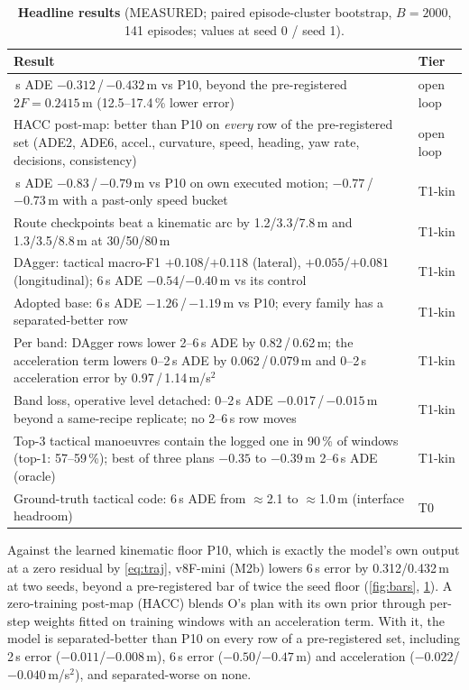 \documentclass[10pt,twocolumn]{article}
\makeatletter
\theoremstyle{remark}
\renewcommand\paragraph{\@startsection{paragraph}{4}{\z@}{1.6ex \@plus .5ex \@minus .2ex}{-1em}{\normalfont\normalsize\bfseries}}
\makeatother
\begin{document}
\begin{table}[t]
\centering
\caption{\textbf{Headline results} (MEASURED; paired episode-cluster bootstrap, $B=2000$, 141 episodes; values at seed 0 / seed 1).}
\label{tab:headline}
\small
\begin{tabularx}{\columnwidth}{@{}>{\raggedright\arraybackslash}Xl@{}}
\toprule
Result & Tier \\
\midrule
6\,s ADE $-0.312$\,/\,$-0.432$\,m vs P10, beyond the pre-registered $2F=0.2415$\,m (12.5--17.4\,\% lower error) & open loop \\
HACC post-map: better than P10 on \emph{every} row of the pre-registered set (ADE2, ADE6, accel., curvature, speed, heading, yaw rate, decisions, consistency) & open loop \\
6\,s ADE $-0.83$\,/\,$-0.79$\,m vs P10 on own executed motion; $-0.77$\,/\,$-0.73$\,m with a past-only speed bucket & T1-kin \\
Route checkpoints beat a kinematic arc by 1.2/3.3/7.8\,m and 1.3/3.5/8.8\,m at 30/50/80\,m & T1-kin \\
DAgger: tactical macro-F1 $+0.108$/$+0.118$ (lateral), $+0.055$/$+0.081$ (longitudinal); 6\,s ADE $-0.54$/$-0.40$\,m vs its control & T1-kin \\
Adopted base: 6\,s ADE $-1.26$\,/\,$-1.19$\,m vs P10; every family has a separated-better row & T1-kin \\
Per band: DAgger rows lower 2--6\,s ADE by 0.82\,/\,0.62\,m; the acceleration term lowers 0--2\,s ADE by 0.062\,/\,0.079\,m and 0--2\,s acceleration error by 0.97\,/\,1.14\,m/s$^2$ & T1-kin \\
Band loss, operative level detached: 0--2\,s ADE $-0.017$\,/\,$-0.015$\,m beyond a same-recipe replicate; no 2--6\,s row moves & T1-kin \\
Top-3 tactical manoeuvres contain the logged one in 90\,\% of windows (top-1: 57--59\,\%); best of three plans $-0.35$ to $-0.39$\,m 2--6\,s ADE (oracle) & T1-kin \\
Ground-truth tactical code: 6\,s ADE from $\approx$2.1 to $\approx$1.0\,m (interface headroom) & T0 \\
\bottomrule
\end{tabularx}
\end{table}

\paragraph{The hierarchy beats its floor.} Against the learned kinematic floor P10, which is exactly the model's own output at a zero
residual by \cref{eq:traj}, v8F-mini (M2b) lowers 6\,s error by 0.312/0.432\,m at two seeds, beyond a pre-registered bar of twice the
seed floor (\cref{fig:bars}, \cref{tab:headline}). A zero-training post-map (HACC) blends O's plan with its own prior through
per-step weights fitted on training windows with an acceleration term. With it, the model is separated-better than P10 on every row of
a pre-registered set, including 2\,s error ($-0.011$/$-0.008$\,m), 6\,s error ($-0.50$/$-0.47$\,m) and acceleration
($-0.022$/$-0.040$\,m/s$^2$), and separated-worse on none.
\end{document}
